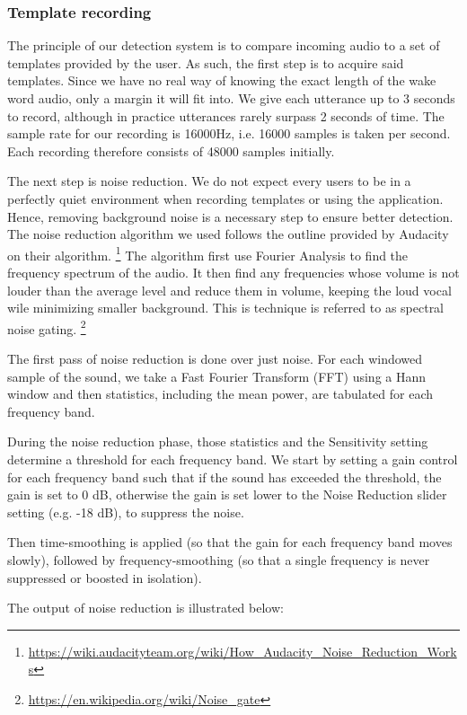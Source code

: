     \subsubsection{Template recording}
    The principle of our detection system is to compare incoming audio to a set of templates provided by the user. As such, the first step is to acquire said templates. Since we have no real way of knowing the exact length of the wake word audio, only a margin it will fit into. We  give each utterance up to 3 seconds to record, although in practice utterances rarely surpass 2 seconds of time. The sample rate for our recording is 16000Hz, i.e. 16000 samples is taken per second. Each recording therefore consists of 48000 samples initially.
    
    The next step is noise reduction. We do not expect every users to be in a perfectly quiet environment when recording templates or using the application. Hence, removing background noise is a necessary step to ensure better detection. The noise reduction algorithm we used follows the outline provided by Audacity on their algorithm. \footnote{\url{https://wiki.audacityteam.org/wiki/How_Audacity_Noise_Reduction_Works}} 
    The algorithm first use Fourier Analysis to find the frequency spectrum of the audio. It then find any frequencies whose volume is not louder than the average level and reduce them in volume, keeping the loud vocal wile minimizing smaller background. This is technique is referred to as spectral noise gating. \footnote{\url{https://en.wikipedia.org/wiki/Noise_gate}}
    
    The first pass of noise reduction is done over just noise. For each windowed sample of the sound, we take a Fast Fourier Transform (FFT) using a Hann window and then statistics, including the mean power, are tabulated for each frequency band.

    During the noise reduction phase, those statistics and the Sensitivity setting determine a threshold for each frequency band. We start by setting a gain control for each frequency band such that if the sound has exceeded the threshold, the gain is set to 0 dB, otherwise the gain is set lower to the Noise Reduction slider setting (e.g. -18 dB), to suppress the noise.

    Then time-smoothing is applied (so that the gain for each frequency band moves slowly), followed by frequency-smoothing (so that a single frequency is never suppressed or boosted in isolation).
    
    The output of noise reduction is illustrated below:
    
